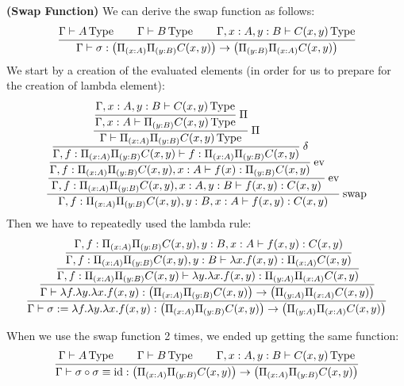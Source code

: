 \begin{definition}{\textbf{(Swap Function)}}
    \label{def:swap-funct}
    We can derive the swap function as follows:
    \begin{equation*}
        \cfrac{\Gamma\vdash A\operatorname{Type} \qquad \Gamma\vdash B\operatorname{Type}\qquad \Gamma, x:A, y:B\vdash C(x, y)\operatorname{Type}}{\Gamma\vdash\sigma:\big( \Pi_{(x:A)}\Pi_{(y:B)}C(x, y) \big)\to\big( \Pi_{(y:B)}\Pi_{(x:A)}C(x, y) \big)}
    \end{equation*}
    We start by a creation of the evaluated elements (in order for us to prepare for the creation of lambda element):
    \begin{equation*}
        \cfrac{\cfrac{\cfrac{\cfrac{\cfrac{\cfrac{\Gamma, x:A, y:B\vdash C(x, y)\type}{\Gamma, x:A\vdash \Pi_{(y:B)}C(x, y) \type}\ \Pi}{\Gamma\vdash \Pi_{(x:A)}\Pi_{(y:B)}C(x, y)\type}\ \Pi}{\Gamma, f:\Pi_{(x:A)}\Pi_{(y:B)}C(x, y)\vdash f:\Pi_{(x:A)}\Pi_{(y:B)}C(x, y)}\ \delta}{\Gamma, f:\Pi_{(x:A)}\Pi_{(y:B)}C(x, y), x:A\vdash f(x):\Pi_{(y:B)}C(x, y)}\text{ ev}}{\Gamma, f:\Pi_{(x:A)}\Pi_{(y:B)}C(x, y), x:A, y:B\vdash f(x, y):C(x, y)}\text{ ev}}{\Gamma, f:\Pi_{(x:A)}\Pi_{(y:B)}C(x, y), y:B, x:A\vdash f(x, y):C(x, y)}\text{ swap}
    \end{equation*}
    Then we have to repeatedly used the lambda rule:
    \begin{equation*}
        \cfrac{\cfrac{\cfrac{\cfrac{\Gamma, f:\Pi_{(x:A)}\Pi_{(y:B)}C(x, y), y:B, x:A\vdash f(x, y):C(x, y)}{\Gamma, f:\Pi_{(x:A)}\Pi_{(y:B)}C(x, y), y:B\vdash \lambda x.f(x, y):\Pi_{(x:A)}C(x, y)}}{\Gamma, f:\Pi_{(x:A)}\Pi_{(y:B)}C(x, y)\vdash \lambda y.\lambda x.f(x, y):\Pi_{(y:A)}\Pi_{(x:A)}C(x, y)}}{\Gamma\vdash \lambda f.\lambda y.\lambda x.f(x, y):\big(\Pi_{(x:A)}\Pi_{(y:B)}C(x, y)\big)\to\big(\Pi_{(y:A)}\Pi_{(x:A)}C(x, y)\big)}}{\Gamma\vdash\sigma:=\lambda f.\lambda y.\lambda x.f(x, y):\big(\Pi_{(x:A)}\Pi_{(y:B)}C(x, y)\big)\to\big(\Pi_{(y:A)}\Pi_{(x:A)}C(x, y)\big)}
    \end{equation*}
\end{definition}

\begin{lemma}
    \label{lemma:swap-two-time}
    When we use the swap function 2 times, we ended up getting the same function:
    \begin{equation*}
        \cfrac{\Gamma\vdash A\operatorname{Type} \qquad \Gamma\vdash B\operatorname{Type}\qquad \Gamma, x:A, y:B\vdash C(x, y)\operatorname{Type}
        }{\Gamma\vdash\sigma\circ\sigma\equiv\operatorname{id}:\big( \Pi_{(x:A)}\Pi_{(y:B)}C(x, y) \big)\to\big( \Pi_{(x:A)}\Pi_{(y:B)}C(x, y) \big)}
    \end{equation*}
\end{lemma}

